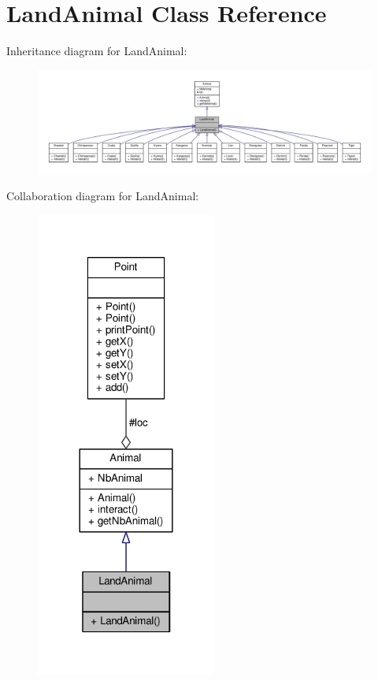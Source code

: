 \hypertarget{classLandAnimal}{}\section{Land\+Animal Class Reference}
\label{classLandAnimal}


Inheritance diagram for Land\+Animal\+:
\nopagebreak
\begin{figure}[H]
\begin{center}
\leavevmode
\includegraphics[width=350pt]{classLandAnimal__inherit__graph}
\end{center}
\end{figure}


Collaboration diagram for Land\+Animal\+:
\nopagebreak
\begin{figure}[H]
\begin{center}
\leavevmode
\includegraphics[width=168pt]{classLandAnimal__coll__graph}
\end{center}
\end{figure}
